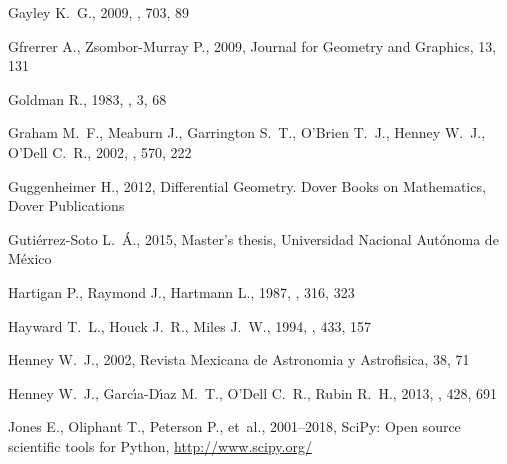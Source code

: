 \documentclass[useAMS, usenatbib, a4paper]{mnras}
\begin{document}
\begin{thebibliography}{}
{Gayley} K.~G.,  2009, \apj, 703, 89

Gfrerrer A.,  Zsombor-Murray P.,  2009, Journal for Geometry and Graphics, 13,
  131

Goldman R.,  1983, , 3, 68

{Graham} M.~F.,  {Meaburn} J.,  {Garrington} S.~T.,  {O'Brien} T.~J.,  {Henney}
  W.~J.,   {O'Dell} C.~R.,  2002, \apj, 570, 222

Guggenheimer H.,  2012, Differential Geometry.
Dover Books on Mathematics, Dover Publications

Guti{\'e}rrez-Soto L.~{\'A}.,  2015, Master's thesis, Universidad Nacional
  Aut{\'o}noma de M{\'e}xico

{Hartigan} P.,  {Raymond} J.,   {Hartmann} L.,  1987, \apj, 316, 323

{Hayward} T.~L.,  {Houck} J.~R.,   {Miles} J.~W.,  1994, \apj, 433, 157

{Henney} W.~J.,  2002, Revista Mexicana de Astronomia y Astrofisica, 38, 71

{Henney} W.~J.,  {Garc{\'{\i}}a-D{\'{\i}}az} M.~T.,  {O'Dell} C.~R.,   {Rubin}
  R.~H.,  2013, \mnras, 428, 691

Jones E.,  Oliphant T.,  Peterson P.,   et~al., 2001--2018, {SciPy}: Open
  source scientific tools for {Python}, \url {http://www.scipy.org/}


\end{thebibliography}
\end{document}
